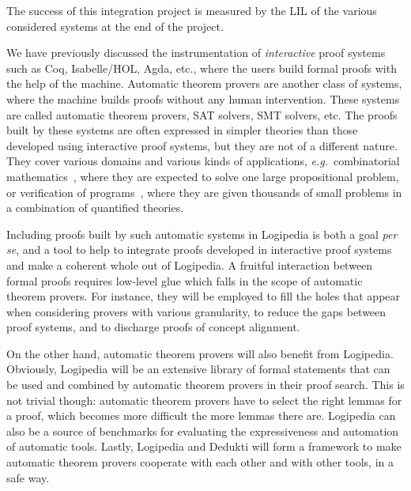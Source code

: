 The success of this integration project is measured by the LIL of the various
considered systems at the end of the project.


We have previously discussed the instrumentation of \emph{interactive}
proof systems such as Coq, Isabelle/HOL, Agda, etc.,
where the users build formal proofs with the help of the
machine. Automatic theorem provers are another class of systems, where
the machine builds proofs without any human intervention.
These systems are called automatic theorem provers, SAT solvers, SMT
solvers, etc.
The proofs
built by these systems are often expressed in simpler theories than
those developed using interactive proof systems, but they are not of a different
nature.  They cover various domains and various kinds of applications,
{\em e.g.}\ combinatorial
mathematics~\cite{DBLP:journals/ai/KonevL15,DBLP:conf/sat/HeuleKM16},
where they are expected to solve one large propositional problem, or
verification of
programs~\cite{DBLP:conf/esop/FilliatreP13,DBLP:journals/pacmpl/ProtzenkoZRRWBD17},
where they are given thousands of small problems in a combination of
quantified theories.

Including proofs built by such automatic systems in Logipedia
is both a goal {\em per se}, and a tool to help to
integrate proofs developed in interactive proof systems and make a coherent whole out
of Logipedia. A fruitful interaction between formal proofs requires
low-level glue which falls in the scope of automatic theorem provers.
For instance, they will be employed to fill the holes that appear when
considering provers with various granularity, to reduce the gaps
between proof systems, and to discharge proofs of concept alignment.

On the other hand, automatic theorem provers will also benefit from
Logipedia. Obviously, Logipedia will be an extensive library of formal
statements that can be used and combined by automatic theorem provers in their
proof search. This is not trivial though: automatic theorem provers have to
select the right lemmas for a proof, which becomes more difficult the more
lemmas there are.  Logipedia can also be a source of benchmarks for evaluating the
expressiveness and automation of automatic tools.  Lastly, Logipedia and Dedukti
will form a framework to make automatic theorem provers cooperate with each
other and with other tools, in a safe way.

